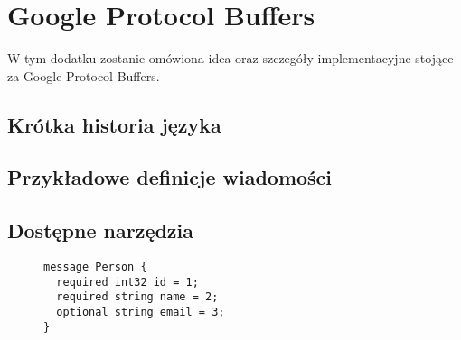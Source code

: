 \chapter{Google Protocol Buffers}
\label{cha:appendixB}
W tym dodatku zostanie omówiona idea oraz szczegóły implementacyjne stojące za Google Protocol Buffers.

\section{Krótka historia języka}
\label{sec:protobuf_history}

\section{Przykładowe definicje wiadomości}
\label{sec:proto_file_examples}

\section{Dostępne narzędzia}
\label{sec:protobuf_available_tools}
\begin{figure}
\label{Najprostsza możliwa wiadomość ProtoBuf}
\begin{lstlisting}
message Person {
  required int32 id = 1;
  required string name = 2;
  optional string email = 3;
}
\end{lstlisting}
\end{figure}